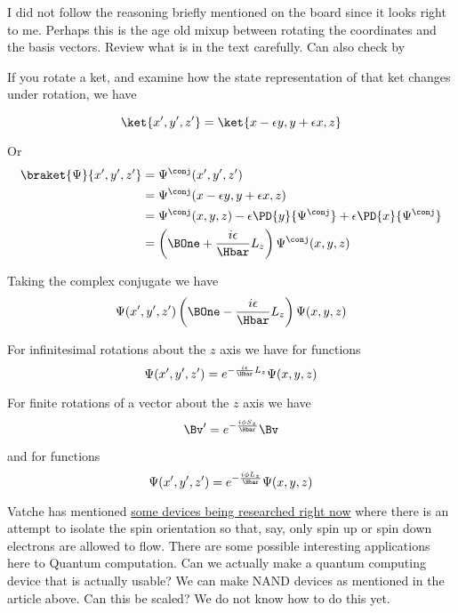 I did not follow the reasoning briefly mentioned on the board since it looks right to me.  Perhaps this is the age old mixup between rotating the coordinates and the basis vectors.  Review what is in the text carefully.  Can also check by

If you rotate a ket, and examine how the state representation of that ket changes under rotation, we have

\begin{equation}\label{eqn:PHY356FDec7:140}
\ket{x', y', z'} = \ket{x - \epsilon y, y + \epsilon x, z}
\end{equation}

Or
\begin{equation}\label{eqn:lecture12rotationsAndAngularMomentum:320}
\begin{aligned}
\braket{\Psi}{x', y', z'}
&=
\Psi^\conj(x', y', z') \\
&=
\Psi^\conj(x - \epsilon y, y + \epsilon x, z) \\
&=
\Psi^\conj(x , y , z)
- \epsilon \PD{y}{\Psi^\conj}
+ \epsilon \PD{x}{\Psi^\conj} \\
&=
\left( \BOne + \frac{i \epsilon} {\Hbar} L_z \right) \Psi^\conj(x , y , z)
\end{aligned}
\end{equation}

Taking the complex conjugate we have
\begin{equation}\label{eqn:PHY356FDec7:150}
\Psi(x', y', z')
\left( \BOne - \frac{i \epsilon} {\Hbar} L_z \right) \Psi(x , y , z)
\end{equation}

For infinitesimal rotations about the \(z\) axis we have for functions
\begin{equation}\label{eqn:PHY356FDec7:160}
\Psi(x', y', z')
=
e^{ - \frac{i \epsilon} {\Hbar} L_z } \Psi(x , y , z)
\end{equation}

For finite rotations of a vector about the \(z\) axis we have
\begin{equation}\label{eqn:PHY356FDec7:170}
\Bv'
=
e^{ -\frac{i \phi S_z} {\Hbar} } \Bv
\end{equation}

and for functions
\begin{equation}\label{eqn:PHY356FDec7:180}
\Psi(x', y', z')
=
e^{ - \frac{i \phi L_z} {\Hbar} } \Psi(x , y , z)
\end{equation}

Vatche has mentioned \href{http://plato.stanford.edu/entries/qt-quantcomp/#2.2}{some devices being researched right now} where there is an attempt to isolate the spin orientation so that, say, only spin up or spin down electrons are allowed to flow.  There are some possible interesting applications here to Quantum computation.  Can we actually make a quantum computing device that is actually usable?  We can make NAND devices as mentioned in the article above.  Can this be scaled?  We do not know how to do this yet.

